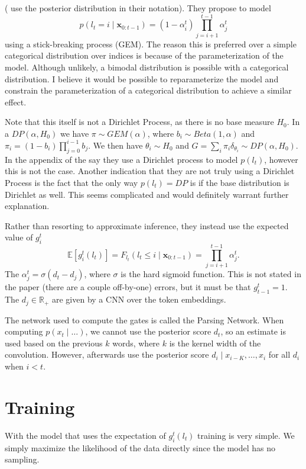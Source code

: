 \documentclass{article}
\newcommand\E[1]{\mathbb{E}\left[#1\right]}
\newcommand{\bx}{\mathbf{x}}
\newcommand{\R}{\mathbb{R}}
\begin{document}
(\citet{shen2018prpn} use the posterior distribution in their notation).
They propose to model 
$$p(l_t=i\mid\bx_{0:t-1})=(1-\alpha_i^t)\prod_{j=i+1}^{t-1}\alpha_j^t$$
using a stick-breaking process (GEM).
The reason this is preferred over a simple categorical distribution over indices is because
of the parameterization of the model.
Although unlikely, a bimodal distribution is possible with a categorical distribution.
I believe it would be possible to reparameterize the model and constrain the parameterization of a 
categorical distribution to achieve a similar effect.

Note that this itself is not a Dirichlet Process, as there is no base measure $H_0$.
In a $DP(\alpha, H_0)$ we have $\pi \sim GEM(\alpha)$,
where $b_i \sim Beta(1,\alpha)$ and $\pi_i = (1-b_i)\prod_{j=0}^{i-1}b_j$.
We then have $\theta_i\sim H_0$ and $G = \sum_i\pi_i\delta_{\theta_i}\sim DP(\alpha, H_0)$.
In the appendix of \citet{shen2018prpn} the say they use a Dirichlet process to model $p(l_t)$,
however this is not the case.
Another indication that they are not truly using a Dirichlet Process is the fact that
the only way $p(l_t) = DP$ is if the base distribution is Dirichlet as well.
This seems complicated and would definitely warrant further explanation.

Rather than resorting to approximate inference, they instead use the expected value of $g_i^t$
$$\E{g_i^t(l_t)} = F_{l_t}(l_t \le i\mid\bx_{0:t-1}) = \prod_{j=i+1}^{t-1}\alpha_j^t.$$
The $\alpha_j^t = \sigma(d_t - d_j)$, where $\sigma$ is the hard sigmoid function.
This is not stated in the paper (there are a couple off-by-one) errors,
but it must be that $g_{t-1}^t = 1$.
The $d_j\in\R_+$ are given by a CNN over the token embeddings.

The network used to compute the gates is called the Parsing Network.
When computing $p(x_t\mid\ldots)$, we cannot use the posterior score $d_t$,
so an estimate is used based on the previous $k$ words, where $k$ is the 
kernel width of the convolution.
However, afterwards \citet{shen2018prpn} use the posterior score $d_i \mid x_{i-K},\ldots, x_i$
for all $d_i$ when $i < t$.

\section{Training}
With the model that uses the expectation of $g_i^t(l_t)$
training is very simple.
We simply maximize the likelihood of the data directly since the model has no
sampling.
\end{document}
